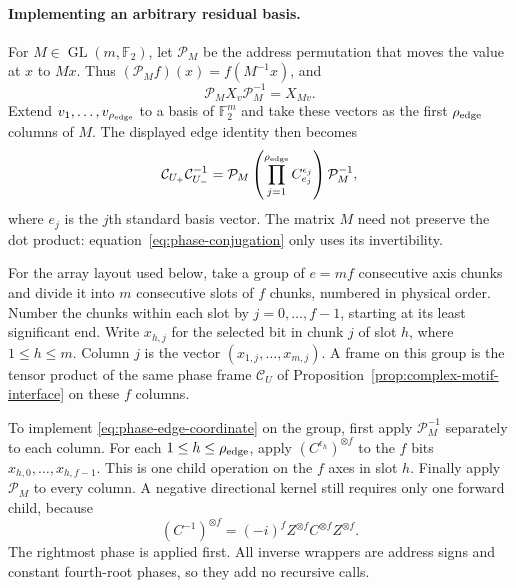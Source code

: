 \documentclass[11pt]{article}
\theoremstyle{definition}
\begin{document}
\paragraph{Implementing an arbitrary residual basis.}
For $M\in\operatorname{GL}(m,\mathbb F_2)$, let $\mathcal P_M$ be the
address permutation that moves the value at $x$ to $Mx$.  Thus
$(\mathcal P_Mf)(x)=f(M^{-1}x)$, and
\begin{equation}\label{eq:phase-conjugation}
 \mathcal P_MX_v\mathcal P_M^{-1}=X_{Mv}.
\end{equation}
Extend $v_1,\ldots,v_{\rho_{\rm edge}}$ to a basis of $\mathbb F_2^m$ and take these vectors as
the first $\rho_{\rm edge}$ columns of $M$.  The displayed edge identity
then becomes
\begin{equation}\label{eq:phase-edge-coordinate}
 \mathcal C_{U_+}\mathcal C_{U_-}^{-1}
 =\mathcal P_M\left(\prod_{j=1}^{\rho_{\rm edge}}C_{e_j}^{\epsilon_j}\right)
   \mathcal P_M^{-1},
\end{equation}
where $e_j$ is the $j$th standard basis vector.  The matrix $M$ need not
preserve the dot product: equation~\eqref{eq:phase-conjugation} only
uses its invertibility.

For the array layout used below, take a group of $e=mf$ consecutive
axis chunks and divide it into $m$ consecutive slots of $f$ chunks,
numbered in physical order.
Number the chunks within each slot by $j=0,\ldots,f-1$, starting at
its least significant end.  Write $x_{h,j}$ for the selected bit in
chunk $j$ of slot $h$, where $1\le h\le m$.  Column $j$ is the vector
$(x_{1,j},\ldots,x_{m,j})$.  A frame on this group is the tensor
product of the same phase frame
$\mathcal C_U$ of Proposition~\ref{prop:complex-motif-interface}
on these $f$ columns.

To implement \eqref{eq:phase-edge-coordinate} on the group, first apply
$\mathcal P_M^{-1}$ separately to each column.  For each
$1\le h\le\rho_{\rm edge}$, apply $(C^{\epsilon_h})^{\otimes f}$ to the
$f$ bits $x_{h,0},\ldots,x_{h,f-1}$.  This is one child operation
on the $f$ axes in slot $h$.  Finally apply $\mathcal P_M$ to every
column.  A negative directional kernel still requires only one
forward child, because
\begin{equation}\label{eq:phase-inverse-child}
 (C^{-1})^{\otimes f}
 =(-i)^f Z^{\otimes f}C^{\otimes f}Z^{\otimes f}.
\end{equation}
The rightmost phase is applied first.  All inverse wrappers are address
signs and constant fourth-root phases, so they add no recursive calls.
\end{document}
